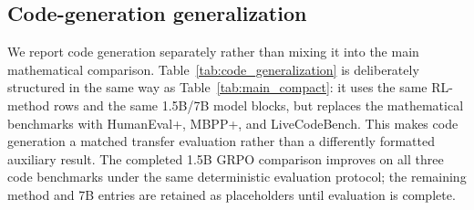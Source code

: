 \documentclass{article}
\begin{document}
\subsection{Code-generation generalization}
We report code generation separately rather than mixing it into the main mathematical comparison. Table~\ref{tab:code_generalization} is deliberately structured in the same way as Table~\ref{tab:main_compact}: it uses the same RL-method rows and the same 1.5B/7B model blocks, but replaces the mathematical benchmarks with HumanEval+, MBPP+, and LiveCodeBench. This makes code generation a matched transfer evaluation rather than a differently formatted auxiliary result. The completed 1.5B GRPO comparison improves on all three code benchmarks under the same deterministic evaluation protocol; the remaining method and 7B entries are retained as placeholders until evaluation is complete.
\end{document}
